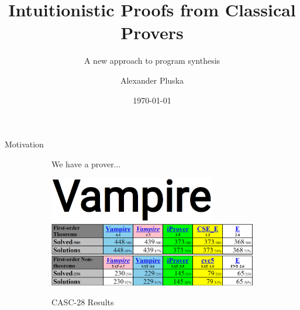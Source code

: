 \documentclass{cubeamer}
\title{Intuitionistic Proofs from Classical Provers}
\subtitle{A new approach to program synthesis}
\author[Alexander Pluska]{Alexander Pluska}
\date{\today} %
\institute[TU Wien]{TU Wien}
\begin{document}
	
	\maketitle
	
	
	\begin{frame}{Motivation}		
		\begin{figure}[!tbp]
			\begin{subfigure}[t]{0.48\textwidth}
				\noindent We have a prover...
				\begin{center}
					\includegraphics[width=0.8\textwidth]{Vampire.png}
					\includegraphics[width=\textwidth]{CASC.png}
					\caption{CASC-28 Results}
				\end{center}
				\vfill
			\end{subfigure}
			\begin{subfigure}[t]{0.48\textwidth}
				\hfill
			\end{subfigure}
		\end{figure}
	\end{frame}
	
\end{document}
